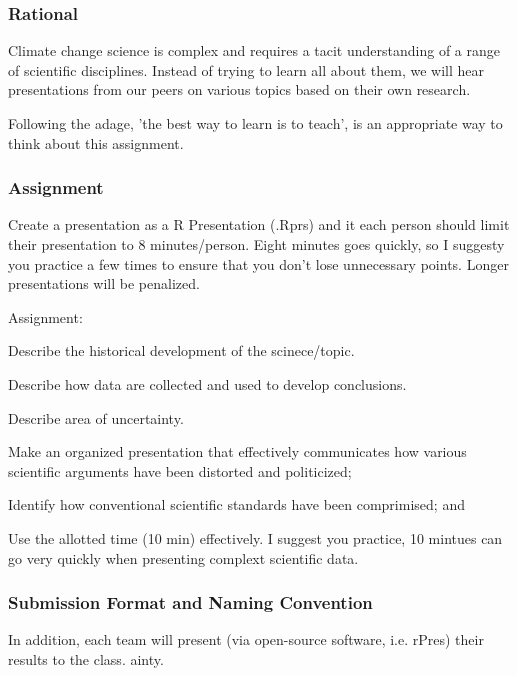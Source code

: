 
\subsubsection{Rational}

Climate change science is complex and requires a tacit understanding of a range of scientific disciplines. Instead of trying to learn all about them, we will hear presentations from our peers on various topics based on their own research. 

Following the adage, 'the best way to learn is to teach', is an appropriate way to think about this assignment. 

\subsubsection{Assignment}

Create a presentation as a R Presentation (.Rprs) and it each person should limit their presentation to 8 minutes/person. Eight minutes goes quickly, so I suggesty you practice a few times to ensure that you don't lose unnecessary points. Longer presentations will be penalized.  

\noindent Assignment: 
\begin{itemize*}
  \item Describe the historical development of the scinece/topic.
  \item Describe how data are collected and used to develop conclusions.
  \item Describe area of uncertainty.
  \item Make an organized presentation that effectively communicates how various scientific arguments have been distorted and politicized;
  \item Identify how conventional scientific standards have been comprimised; and
  \item Use the allotted time (10 min) effectively. I suggest you practice, 10 mintues can go very quickly when presenting complext scientific data.
\end{itemize*}

\subsubsection{Submission Format and Naming Convention}

In addition, each team will present (via open-source software, i.e. rPres) their results to the class. 
ainty.

